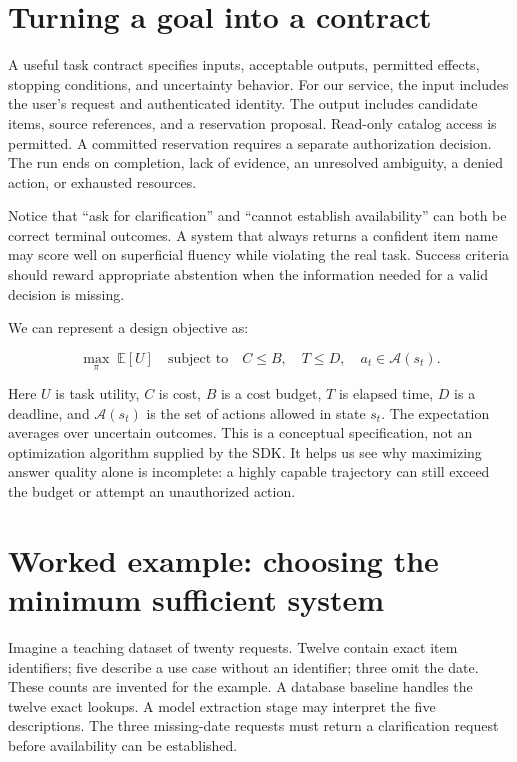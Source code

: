 \section{Turning a goal into a contract}
A useful task contract specifies inputs, acceptable outputs, permitted effects, stopping conditions, and uncertainty behavior. For our service, the input includes the user's request and authenticated identity. The output includes candidate items, source references, and a reservation proposal. Read-only catalog access is permitted. A committed reservation requires a separate authorization decision. The run ends on completion, lack of evidence, an unresolved ambiguity, a denied action, or exhausted resources.

Notice that “ask for clarification” and “cannot establish availability” can both be correct terminal outcomes. A system that always returns a confident item name may score well on superficial fluency while violating the real task. Success criteria should reward appropriate abstention when the information needed for a valid decision is missing.

We can represent a design objective as:

\begin{equation}
\max_{\pi}\;\mathbb{E}[U]\quad\text{subject to}\quad C\leq B,\quad T\leq D,\quad a_t\in\mathcal{A}(s_t).
\end{equation}

Here \(U\) is task utility, \(C\) is cost, \(B\) is a cost budget, \(T\) is elapsed time, \(D\) is a deadline, and \(\mathcal{A}(s_t)\) is the set of actions allowed in state \(s_t\). The expectation averages over uncertain outcomes. This is a conceptual specification, not an optimization algorithm supplied by the SDK. It helps us see why maximizing answer quality alone is incomplete: a highly capable trajectory can still exceed the budget or attempt an unauthorized action.

\section{Worked example: choosing the minimum sufficient system}
Imagine a teaching dataset of twenty requests. Twelve contain exact item identifiers; five describe a use case without an identifier; three omit the date. These counts are invented for the example. A database baseline handles the twelve exact lookups. A model extraction stage may interpret the five descriptions. The three missing-date requests must return a clarification request before availability can be established.


